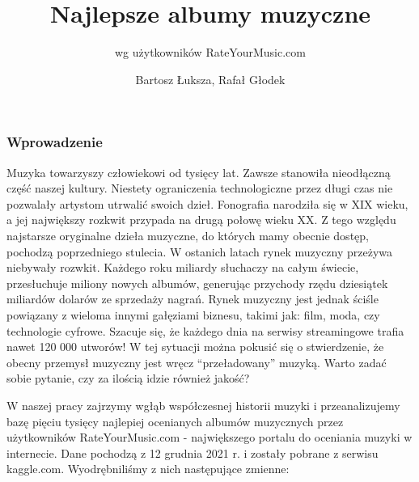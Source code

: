 \documentclass[
  letterpaper,
  DIV=11,
  numbers=noendperiod]{scrartcl}
\title{Najlepsze albumy muzyczne}
\subtitle{wg użytkowników RateYourMusic.com}
\author{Bartosz Łuksza, Rafał Głodek}
\date{}
\begin{document}
\maketitle


\subsubsection{Wprowadzenie}\label{wprowadzenie}

Muzyka towarzyszy człowiekowi od tysięcy lat. Zawsze stanowiła
nieodłączną część naszej kultury. Niestety ograniczenia technologiczne
przez długi czas nie pozwalały artystom utrwalić swoich dzieł.
Fonografia narodziła się w XIX wieku, a jej największy rozkwit przypada
na drugą połowę wieku XX. Z tego względu najstarsze oryginalne dzieła
muzyczne, do których mamy obecnie dostęp, pochodzą poprzedniego
stulecia. W ostanich latach rynek muzyczny przeżywa niebywały rozwkit.
Każdego roku miliardy słuchaczy na całym świecie, przesłuchuje miliony
nowych albumów, generując przychody rzędu dziesiątek miliardów dolarów
ze sprzedaży nagrań. Rynek muzyczny jest jednak ściśle powiązany z
wieloma innymi gałęziami biznesu, takimi jak: film, moda, czy
technologie cyfrowe. Szacuje się, że każdego dnia na serwisy
streamingowe trafia nawet 120 000 utworów! W tej sytuacji można pokusić
się o stwierdzenie, że obecny przemysł muzyczny jest wręcz
``przeładowany'' muzyką. Warto zadać sobie pytanie, czy za ilością idzie
również jakość?

W naszej pracy zajrzymy wgłąb współczesnej historii muzyki i
przeanalizujemy bazę pięciu tysięcy najlepiej ocenianych albumów
muzycznych przez użytkowników RateYourMusic.com - największego portalu
do oceniania muzyki w internecie. Dane pochodzą z 12 grudnia 2021 r. i
zostały pobrane z serwisu kaggle.com. Wyodrębniliśmy z nich następujące
zmienne:
\end{document}
